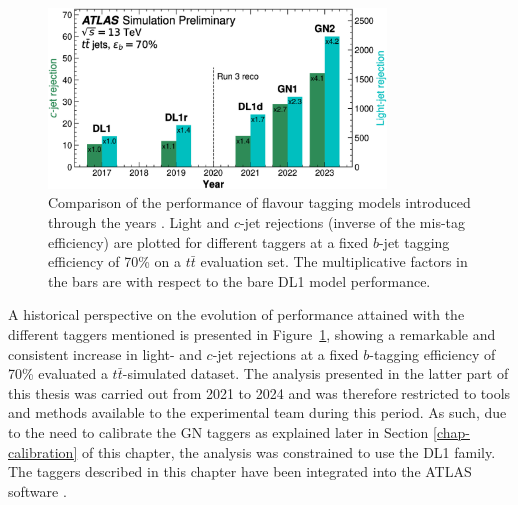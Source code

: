 \begin{figure}[h!]
  \center
  \includegraphics[width=0.8\textwidth]{Images/FTAG/storyFtag.png}
  \caption{Comparison of the performance of flavour tagging models introduced through the years \cite{ATL-PLOT-FTAG-2023-01}. Light and $c$-jet rejections (inverse of the mis-tag efficiency) are plotted for different taggers at a fixed $b$-jet tagging efficiency of 70\% on a $t\bar{t}$ evaluation set. The multiplicative factors in the bars are with respect to the bare DL1 model performance.} 
  \label{fig:storyFtag}
\end{figure}

A historical perspective on the evolution of performance attained with the different taggers mentioned is presented in Figure~\ref{fig:storyFtag}, showing a remarkable and consistent increase in light- and $c$-jet rejections at a fixed $b$-tagging efficiency of 70\% evaluated a $t\bar{t}$-simulated dataset. The analysis presented in the latter part of this thesis was carried out from 2021 to 2024 and was therefore restricted to tools and methods available to the experimental team during this period. As such, due to the need to calibrate the GN taggers as explained later in Section \ref{chap-calibration} of this chapter, the analysis was constrained to use the DL1 family. The taggers described in this chapter have been integrated into the ATLAS software \cite{ATL-SOFT-PUB-2021-001}. 

